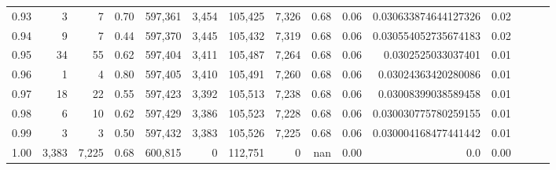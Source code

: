 \begin{tabular}{rrrrrrrrrrrrrrr}
0.93 &       3 &       7 &  0.70 &  597,361 &    3,454 &  105,425 &    7,326 &  0.68 &  0.06 &  0.030633874644127326 &      0.02 \\
0.94 &       9 &       7 &  0.44 &  597,370 &    3,445 &  105,432 &    7,319 &  0.68 &  0.06 &  0.030554052735674183 &      0.02 \\
0.95 &      34 &      55 &  0.62 &  597,404 &    3,411 &  105,487 &    7,264 &  0.68 &  0.06 &    0.0302525033037401 &      0.01 \\
0.96 &       1 &       4 &  0.80 &  597,405 &    3,410 &  105,491 &    7,260 &  0.68 &  0.06 &   0.03024363420280086 &      0.01 \\
0.97 &      18 &      22 &  0.55 &  597,423 &    3,392 &  105,513 &    7,238 &  0.68 &  0.06 &   0.03008399038589458 &      0.01 \\
0.98 &       6 &      10 &  0.62 &  597,429 &    3,386 &  105,523 &    7,228 &  0.68 &  0.06 &  0.030030775780259155 &      0.01 \\
0.99 &       3 &       3 &  0.50 &  597,432 &    3,383 &  105,526 &    7,225 &  0.68 &  0.06 &  0.030004168477441442 &      0.01 \\
1.00 &   3,383 &   7,225 &  0.68 &  600,815 &        0 &  112,751 &        0 &   nan &  0.00 &                   0.0 &      0.00 \\
\bottomrule
\end{tabular}
